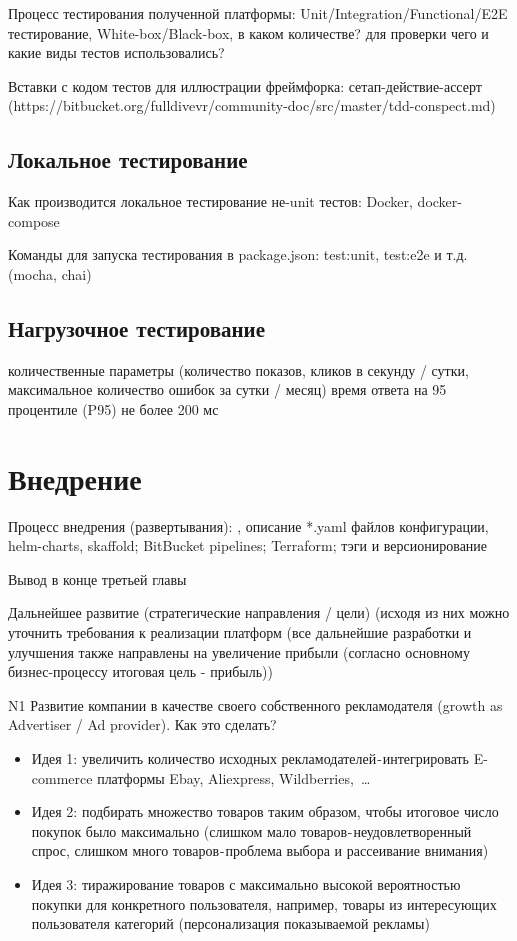 \documentclass[times]{itmo-student-thesis}
\begin{document}
Процесс тестирования полученной платформы: Unit/Integration/Functional/E2E тестирование, White-box/Black-box, в каком количестве? для проверки чего и какие виды тестов использовались?

Вставки с кодом тестов для иллюстрации фреймфорка: сетап-действие-ассерт (https://bitbucket.org/fulldivevr/community-doc/src/master/tdd-conspect.md)

\subsection{Локальное тестирование}

Как производится локальное тестирование не-unit тестов: Docker, docker-compose

Команды для запуска тестирования в package.json: test:unit, test:e2e и т.д. (mocha, chai)

\subsection{Нагрузочное тестирование}

количественные параметры (количество показов, кликов в секунду / сутки, максимальное количество ошибок за сутки / месяц)
время ответа на 95 процентиле (P95) не более 200 мс

\section{Внедрение}

Процесс внедрения (развертывания): , описание *.yaml файлов конфигурации, helm-charts, skaffold; BitBucket pipelines; Terraform; тэги и версионирование

\chapterconclusion

Вывод в конце третьей главы





\startconclusionpage

Дальнейшее развитие (стратегические направления / цели) (исходя из них можно уточнить требования к реализации платформ
(все дальнейшие разработки и улучшения также направлены на увеличение прибыли (согласно основному бизнес-процессу итоговая цель - прибыль))

N1 Развитие компании в качестве своего собственного рекламодателя (growth as Advertiser / Ad provider). Как это сделать?
\begin{itemize}
\item Идея 1: увеличить количество исходных рекламодателей - интегрировать E-commerce платформы Ebay, Aliexpress, Wildberries, …
\item Идея 2: подбирать множество товаров таким образом, чтобы итоговое число покупок было максимально (слишком мало товаров - неудовлетворенный спрос, слишком много товаров - проблема выбора и рассеивание внимания)
\item Идея 3: тиражирование товаров с максимально высокой вероятностью покупки для конкретного пользователя, например, товары из интересующих пользователя категорий (персонализация показываемой рекламы)
\end{itemize}
\end{document}
